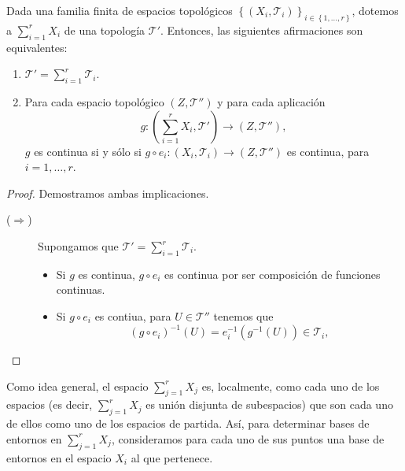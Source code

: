 \begin{prop}
	Dada una familia finita de espacios topológicos $\displaystyle \left\{ \left(X_{i}, \mathcal{T}_{i}\right)\right\} _{i \in \left\{ 1, \ldots, r\right\} } $, dotemos a $\displaystyle \sum^{r}_{i=1}X_{i} $ de una topología $\displaystyle \mathcal{T}' $. Entonces, las siguientes afirmaciones son equivalentes:
	\begin{enumerate}
	\item $\displaystyle \mathcal{T}' = \sum^{r}_{i = 1}\mathcal{T}_{i} $.
	\item Para cada espacio topológico $\displaystyle \left(Z, \mathcal{T}''\right) $ y para cada aplicación
		\[g : \left(\sum^{r}_{i = 1}X_{i}, \mathcal{T}'\right)\to \left(Z, \mathcal{T}''\right) ,\]
		$\displaystyle g $ es continua si y sólo si $\displaystyle g \circ e_{i} : \left(X_{i}, \mathcal{T}_{i}\right)\to \left(Z, \mathcal{T}''\right)$ es continua, para $\displaystyle i = 1, \ldots, r $. 
	\end{enumerate}
\end{prop}
\begin{proof}
	Demostramos ambas implicaciones. 
	\begin{description}
	\item[($\displaystyle \Rightarrow $)] Supongamos que $\displaystyle \mathcal{T}' = \sum^{r}_{i = 1}\mathcal{T}_{i} $. 
		\begin{itemize}
		\item Si $\displaystyle g $ es continua, $\displaystyle g\circ e_{i} $ es continua por ser composición de funciones continuas. 
		\item Si $\displaystyle g\circ e_{i} $ es contiua, para $\displaystyle U \in \mathcal{T}'' $ tenemos que 
			\[\left(g\circ e_{i}\right)^{-1}\left(U\right)=e^{-1}_{i}\left(g^{-1}\left(U\right)\right)\in \mathcal{T}_{i} ,\]
		
	\end{itemize}
		
	\end{description}
\end{proof}

Como idea general, el espacio $\displaystyle \sum^{r}_{j = 1}X_{j} $ es, localmente, como cada uno de los espacios (es decir, $\displaystyle \sum^{r}_{j = 1}X_{j} $ es unión disjunta de subespacios) que son cada uno de ellos como uno de los espacios de partida. Así, para determinar bases de entornos en $\displaystyle \sum^{r}_{j = 1}X_{j} $, consideramos para cada uno de sus puntos una base de entornos en el espacio $\displaystyle X_{i} $ al que pertenece. \\

